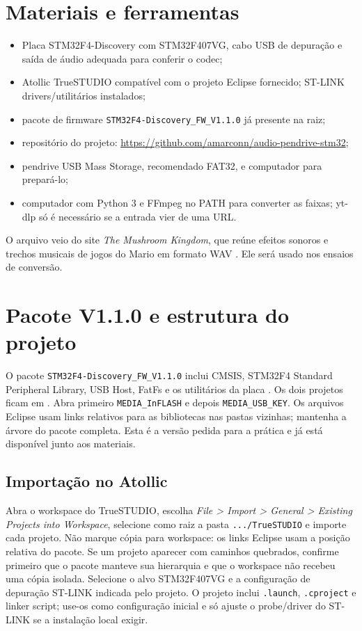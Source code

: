 \documentclass[12pt,journal,compsoc]{IEEEtran}
\begin{document}
\section{Materiais e ferramentas}
\begin{itemize}
\item Placa STM32F4-Discovery com STM32F407VG, cabo USB de depuração e saída de áudio adequada para conferir o codec;
\item Atollic TrueSTUDIO compatível com o projeto Eclipse fornecido; ST-LINK drivers/utilitários instalados;
\item pacote de firmware \texttt{STM32F4-Discovery\_FW\_V1.1.0} já presente na raiz;
\item repositório do projeto: \url{https://github.com/amarconn/audio-pendrive-stm32};
\item pendrive USB Mass Storage, recomendado FAT32, e computador para prepará-lo;
\item computador com Python 3 e FFmpeg no PATH para converter as faixas; yt-dlp só é necessário se a entrada vier de uma URL.
\end{itemize}

O arquivo  veio do site \textit{The Mushroom Kingdom}, que reúne efeitos sonoros e trechos musicais de jogos do Mario em formato WAV \cite{tmk}. Ele será usado nos ensaios de conversão.

\section{Pacote V1.1.0 e estrutura do projeto}
O pacote \texttt{STM32F4-Discovery\_FW\_V1.1.0} inclui CMSIS, STM32F4 Standard Peripheral Library, USB Host, FatFs e os utilitários da placa \cite{fw}. Os dois projetos ficam em . Abra primeiro \texttt{MEDIA\_InFLASH} e depois \texttt{MEDIA\_USB\_KEY}. Os arquivos Eclipse usam links relativos para as bibliotecas nas pastas vizinhas; mantenha a árvore do pacote completa. Esta é a versão pedida para a prática e já está disponível junto aos materiais.

\subsection{Importação no Atollic}
Abra o workspace do TrueSTUDIO, escolha \textit{File > Import > General > Existing Projects into Workspace}, selecione como raiz a pasta \texttt{.../TrueSTUDIO} e importe cada projeto. Não marque cópia para workspace: os links Eclipse usam a posição relativa do pacote. Se um projeto aparecer com caminhos quebrados, confirme primeiro que o pacote manteve sua hierarquia e que o workspace não recebeu uma cópia isolada. Selecione o alvo STM32F407VG e a configuração de depuração ST-LINK indicada pelo projeto. O projeto inclui \texttt{.launch}, \texttt{.cproject} e linker script; use-os como configuração inicial e só ajuste o probe/driver do ST-LINK se a instalação local exigir.
\end{document}
